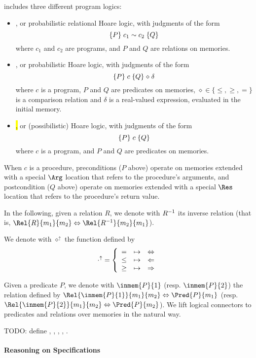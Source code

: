 \EasyCrypt includes three different program logics:
\begin{itemize}
\item \prhl, or probabilistic relational Hoare logic, with judgments of the form
$$\{P\}\; c_1 \mathrel{\sim} c_2\; \{Q\}$$
where $c_1$ and $c_2$ are programs, and $P$ and $Q$
are relations on memories.
\item \phl, or probabilistic Hoare logic, with judgments of the form
$$\{P\}\; c\; \{Q\} \mathrel{\diamond} \delta$$
where $c$ is a program, $P$ and $Q$ are predicates on memories,
$\diamond\in\{\leq,\geq,=\}$ is a comparison relation and $\delta$ is
a real-valued expression, evaluated in the initial memory.
\item \hl, or (possibilistic) Hoare logic, with judgments of the form
$$\{P\}\; c\; \{Q\}$$
where $c$ is a program, and $P$ and $Q$ are predicates on memories.
\end{itemize}

When $c$ is a procedure, preconditions ($P$ above) operate on memories
extended with a special $\Arg$ location that refers to the procedure's
arguments, and postcondition ($Q$ above) operate on memories extended
with a special $\Res$ location that refers to the procedure's return
value.

In the following, given a relation $R$, we denote with $R^{-1}$
its inverse relation (that is,
$\Rel{R}{m_1}{m_2} \Leftrightarrow \Rel{\invrel{R}}{m_2}{m_1}$).

We denote with $\diamond^{\uparrow}$ the function defined by
$$
\cdot^{\uparrow} =
\left\{\begin{array}{l @{\quad\mapsto\quad} r}
=    & \Leftrightarrow \\
\leq & \Leftarrow      \\
\geq & \Rightarrow
\end{array}\right.
$$

Given a predicate $P$, we denote with $\inmem{P}{1}$
(resp. $\inmem{P}{2}$) the relation defined by
$\Rel{\inmem{P}{1}}{m_1}{m_2} \Leftrightarrow \Pred{P}{m_1}$
(resp. $\Rel{\inmem{P}{2}}{m_1}{m_2} \Leftrightarrow \Pred{P}{m_2}$).
We lift logical connectors to predicates and relations over memories
in the natural way.

TODO: define , , , ,
.

\paragraph{Reasoning on Specifications}










%

